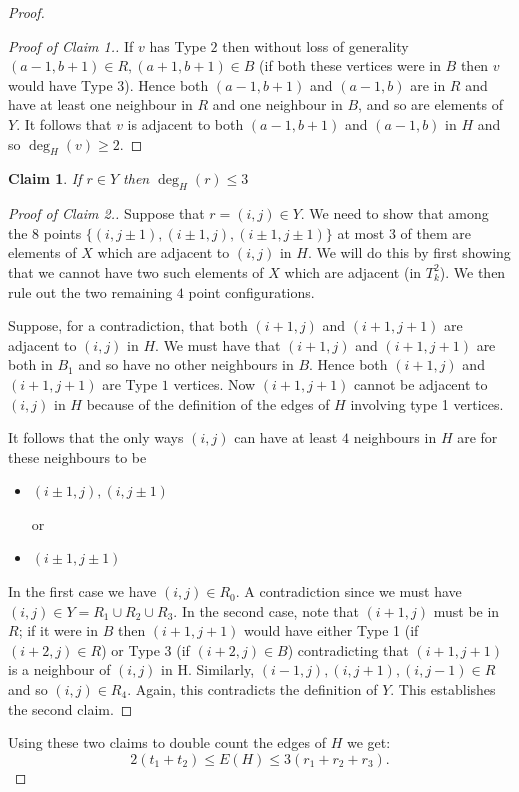 \documentclass[12pt,a4paper]{article}
\newtheorem{claim}{Claim}
\begin{document}
\begin{proof}
\begin{proof}[Proof of Claim 1.]
If $v$ has Type $2$ then without loss of generality $(a-1,b+1)\in R, (a+1,b+1)\in B$ (if both these vertices were in $B$ then $v$ would have Type $3$). Hence both $(a-1,b+1)$ and $(a-1,b)$ are in $R$ and have at least one neighbour in $R$ and one neighbour in $B$, and so are elements of $Y$. It follows that $v$ is adjacent to both $(a-1,b+1)$ and $(a-1,b)$ in $H$ and so $\deg_H(v)\geq 2$.
\end{proof}

\begin{claim}
If $r\in Y$ then $\deg_H(r)\leq 3$
\end{claim}

\begin{proof}[Proof of Claim 2.]
Suppose that $r=(i,j)\in Y$. We need to show that among the $8$ points $\{(i,j\pm1), (i\pm1,j),(i\pm1,j\pm1)\}$ at most $3$ of them are elements of $X$ which are adjacent to $(i,j)$ in $H$. We will do this by first showing that we cannot have two such elements of $X$ which are adjacent (in $T_k^2$). We then rule out the two remaining $4$ point configurations.  

Suppose, for a contradiction, that both $(i+1,j)$ and $(i+1,j+1)$ are adjacent to $(i,j)$ in $H$. We must have that $(i+1,j)$ and $(i+1,j+1)$ are both in $B_1$ and so have no other neighbours in $B$. Hence both $(i+1,j)$ and $(i+1,j+1)$ are Type $1$ vertices. Now $(i+1,j+1)$ cannot be adjacent to $(i,j)$ in $H$ because of the definition of the edges of $H$ involving type 1 vertices. 

It follows that the only ways $(i,j)$ can have at least $4$ neighbours in $H$ are for these neighbours to be
\begin{itemize}
\item $(i\pm 1,j), (i,j\pm 1)$

or

\item $(i\pm 1,j\pm 1)$
\end{itemize}
In the first case we have $(i,j)\in R_0$. A contradiction since we must have $(i,j)\in Y=R_1\cup R_2\cup R_3$. In the second case, note that $(i+1,j)$ must be in $R$; if it were in $B$ then $(i+1,j+1)$ would have either Type 1 (if $(i+2,j)\in R$) or Type 3 (if $(i+2,j)\in B$) contradicting that $(i+1,j+1)$ is a neighbour of $(i,j)$ in H. Similarly, $(i-1,j),(i,j+1),(i,j-1)\in R$ and so $(i,j)\in R_4$. Again, this contradicts the definition of $Y$. This establishes the second claim.
\end{proof}

Using these two claims to double count the edges of $H$ we get:
\[
2(t_1+t_2)\leq E(H)\leq 3(r_1+r_2+r_3).
\]


\end{proof}
\end{document}
